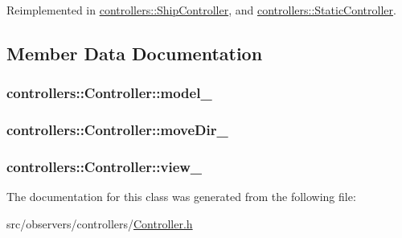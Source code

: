 \-Reimplemented in \hyperlink{classcontrollers_1_1ShipController_aba9b143d8f08e65db262fbabc846ed38}{controllers\-::\-Ship\-Controller}, and \hyperlink{classcontrollers_1_1StaticController_a984d6aca74ea9108462d5906f2853a72}{controllers\-::\-Static\-Controller}.



\subsection{\-Member \-Data \-Documentation}
\hypertarget{classcontrollers_1_1Controller_a4238e40666b91a3f95a9459233037e0b}{
\subsubsection[{model\-\_\-}]{ {\bf controllers\-::\-Controller\-::model\-\_\-}}}\label{d4/d85/classcontrollers_1_1Controller_a4238e40666b91a3f95a9459233037e0b}
\hypertarget{classcontrollers_1_1Controller_a0bd9a0e7a7d6e7ef4ea4861e4e907016}{
\subsubsection[{move\-Dir\-\_\-}]{ {\bf controllers\-::\-Controller\-::move\-Dir\-\_\-}}}\label{d4/d85/classcontrollers_1_1Controller_a0bd9a0e7a7d6e7ef4ea4861e4e907016}
\hypertarget{classcontrollers_1_1Controller_ad15a9e80d35f43a394775ab8292ee561}{
\subsubsection[{view\-\_\-}]{ {\bf controllers\-::\-Controller\-::view\-\_\-}}}\label{d4/d85/classcontrollers_1_1Controller_ad15a9e80d35f43a394775ab8292ee561}


\-The documentation for this class was generated from the following file\-:\begin{DoxyCompactItemize}
\item 
src/observers/controllers/\hyperlink{Controller_8h}{\-Controller.\-h}\end{DoxyCompactItemize}
